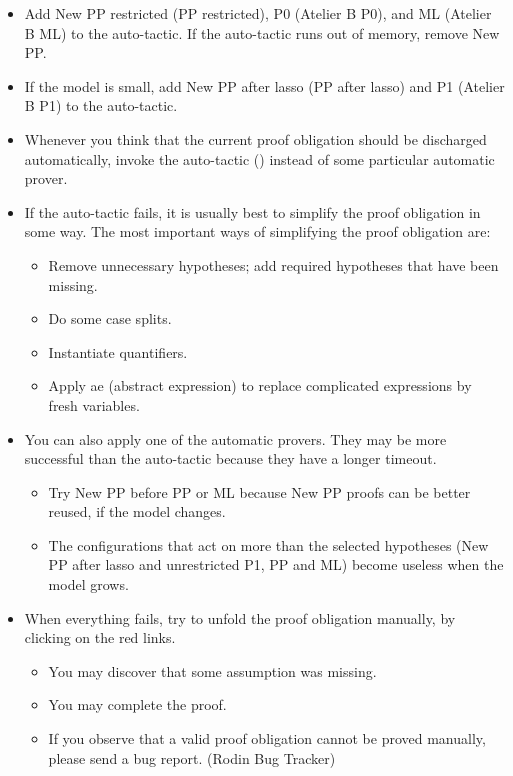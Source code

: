 \begin{itemize}
	\item Add New PP restricted (PP restricted), P0 (Atelier B P0), and ML (Atelier B ML) to the auto-tactic. If the auto-tactic runs out of memory, remove New PP.
	\item If the model is small, add New PP after lasso (PP after lasso) and P1 (Atelier B P1) to the auto-tactic.
	\item Whenever you think that the current proof obligation should be discharged automatically, invoke the auto-tactic () instead of some particular automatic prover.
	\item If the auto-tactic fails, it is usually best to simplify the proof obligation in some way. The most important ways of simplifying the proof obligation are:
	\begin{itemize}
		\item Remove unnecessary hypotheses; add required hypotheses that have been missing.
		\item Do some case splits.
		\item Instantiate quantifiers.
		\item Apply ae (abstract expression) to replace complicated expressions by fresh variables. 
	\end{itemize}
	\item You can also apply one of the automatic provers. They may be more successful than the auto-tactic because they have a longer timeout.
	\begin{itemize}
		\item Try New PP before PP or ML because New PP proofs can be better reused, if the model changes.
		\item The configurations that act on more than the selected hypotheses (New PP after lasso and unrestricted P1, PP and ML) become useless when the model grows. 
	\end{itemize}
	\item When everything fails, try to unfold the proof obligation manually, by clicking on the red links.
	\begin{itemize}
		\item You may discover that some assumption was missing.
		\item You may complete the proof.
		\item If you observe that a valid proof obligation cannot be proved manually, please send a bug report. (Rodin Bug Tracker) 
	\end{itemize}
\end{itemize}

